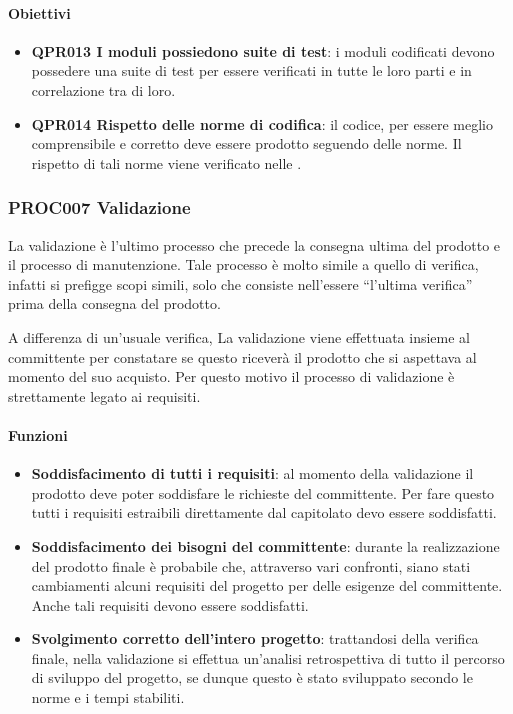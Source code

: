         \paragraph{Obiettivi}
        \begin{itemize}
            \item \textbf{QPR013 I moduli possiedono suite di test}: i moduli codificati devono possedere una suite di test per essere verificati in tutte le loro parti e in correlazione tra di loro.
            \item \textbf{QPR014 Rispetto delle norme di codifica}: il codice, per essere meglio comprensibile e corretto deve essere prodotto seguendo delle norme. Il rispetto di tali norme viene verificato nelle \NdPd.
        \end{itemize}
    
    \subsubsection{PROC007 Validazione}\label{proc007}
    La validazione è l'ultimo processo che precede la consegna ultima del prodotto e il processo di manutenzione. Tale processo è molto simile a quello di verifica, infatti si prefigge scopi simili, solo che consiste nell'essere ``l'ultima verifica'' prima della consegna del prodotto.\par
    A differenza di un'usuale verifica, La validazione viene effettuata insieme al committente per constatare se questo riceverà il prodotto che si aspettava al momento del suo acquisto. Per questo motivo il processo di validazione è strettamente legato ai requisiti.
    
    \paragraph{Funzioni}
    \begin{itemize}
        \item \textbf{Soddisfacimento di tutti i requisiti}: al momento della validazione il prodotto deve poter soddisfare le richieste del committente. Per fare questo tutti i requisiti estraibili direttamente dal capitolato devo essere soddisfatti.
        \item \textbf{Soddisfacimento dei bisogni del committente}: durante la realizzazione del prodotto finale è probabile che, attraverso vari confronti, siano stati cambiamenti alcuni requisiti del progetto per delle esigenze del committente. Anche tali requisiti devono essere soddisfatti.
        \item \textbf{Svolgimento corretto dell'intero progetto}: trattandosi della verifica finale, nella validazione si effettua un'analisi retrospettiva di tutto il percorso di sviluppo del progetto, se dunque questo è stato sviluppato secondo le norme e i tempi stabiliti.
    \end{itemize}

